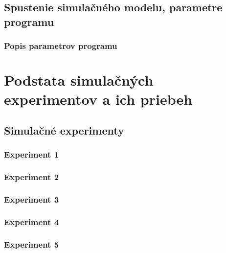 \documentclass[a4paper, 11pt]{article}
\begin{document}
\subsection{Spustenie simulačného modelu, parametre programu}



\subsubsection{Popis parametrov programu}



\pagebreak
\section{Podstata simulačných experimentov a ich priebeh}



\subsection{Simulačné experimenty}

\subsubsection{Experiment 1}



\subsubsection{Experiment 2}



\subsubsection{Experiment 3}



\subsubsection{Experiment 4}



\subsubsection{Experiment 5}
\end{document}
